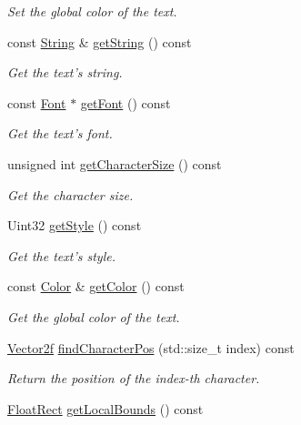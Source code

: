 \begin{DoxyCompactItemize}
\begin{DoxyCompactList}\small\item\em Set the global color of the text. \end{DoxyCompactList}\item 
const \hyperlink{classsf_1_1_string}{String} \& \hyperlink{classsf_1_1_text_a14d580e8afdd43c210429505310ecc95}{get\+String} () const 
\begin{DoxyCompactList}\small\item\em Get the text's string. \end{DoxyCompactList}\item 
const \hyperlink{classsf_1_1_font}{Font} $\ast$ \hyperlink{classsf_1_1_text_ab831de193307ab591b34221440613aa1}{get\+Font} () const 
\begin{DoxyCompactList}\small\item\em Get the text's font. \end{DoxyCompactList}\item 
unsigned int \hyperlink{classsf_1_1_text_a9abb85c6966c9879f6ba4d6e47be1dd5}{get\+Character\+Size} () const 
\begin{DoxyCompactList}\small\item\em Get the character size. \end{DoxyCompactList}\item 
Uint32 \hyperlink{classsf_1_1_text_a3f7483a48faf66378da19d36ff6145cf}{get\+Style} () const 
\begin{DoxyCompactList}\small\item\em Get the text's style. \end{DoxyCompactList}\item 
const \hyperlink{classsf_1_1_color}{Color} \& \hyperlink{classsf_1_1_text_ae42818342a74a9d04644e2fbbd4ca29a}{get\+Color} () const 
\begin{DoxyCompactList}\small\item\em Get the global color of the text. \end{DoxyCompactList}\item 
\hyperlink{classsf_1_1_vector2}{Vector2f} \hyperlink{classsf_1_1_text_adf120ed4159e43daa782b17fea23ea82}{find\+Character\+Pos} (std\+::size\+\_\+t index) const 
\begin{DoxyCompactList}\small\item\em Return the position of the {\itshape index-\/th} character. \end{DoxyCompactList}\item 
\hyperlink{classsf_1_1_rect}{Float\+Rect} \hyperlink{classsf_1_1_text_a8a766ea03a1b8899cd1542765771a4ae}{get\+Local\+Bounds} () const 

\end{DoxyCompactItemize}
